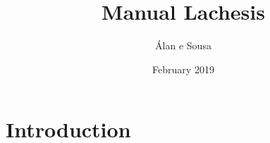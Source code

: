 \documentclass{article}
\title{Manual Lachesis}
\author{Álan e Sousa}
\date{February 2019}
\begin{document}
\maketitle

\section{Introduction}
\end{document}
